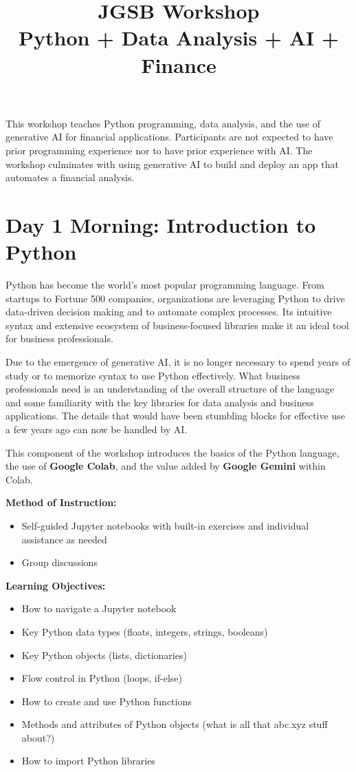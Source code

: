 \documentclass[11pt]{scrartcl}
\title{\textbf{JGSB Workshop\\
Python + Data Analysis + AI + Finance}}
\author{}
\date{}
\begin{document}
\maketitle

This workshop teaches Python programming, data analysis, and the use of generative AI for financial applications. Participants are not expected to have prior programming experience nor to have prior experience with AI. The workshop culminates with using generative AI to build and deploy an app that automates a financial analysis.

\section*{Day 1 Morning: Introduction to Python}

Python has become the world's most popular programming language. From startups to Fortune 500 companies, organizations are leveraging Python to drive data-driven decision making and to automate complex processes. Its intuitive syntax and extensive ecosystem of business-focused libraries make it an ideal tool for business professionals.

Due to the emergence of generative AI, it is no longer necessary to spend years of study or to memorize syntax to use Python effectively. What business professionals need is an understanding of the overall structure of the language and some familiarity with the key libraries for data analysis and business applications. The details that would have been stumbling blocks for effective use a few years ago can now be handled by AI.

This component of the workshop introduces the basics of the Python language, the use of \textbf{Google Colab}, and the value added by \textbf{Google Gemini} within Colab.

\vspace{\baselineskip}
\noindent\textbf{Method of Instruction:}

\begin{itemize}
\item Self-guided Jupyter notebooks with built-in exercises and individual assistance as needed
\item Group discussions
\end{itemize}

\noindent\textbf{Learning Objectives:}

\begin{itemize}
\item How to navigate a Jupyter notebook
\item Key Python data types (floats, integers, strings, booleans)
\item Key Python objects (lists, dictionaries)
\item Flow control in Python (loops, if-else)
\item How to create and use Python functions
\item Methods and attributes of Python objects (what is all that abc.xyz stuff about?)
\item How to import Python libraries
\end{itemize}
\end{document}
